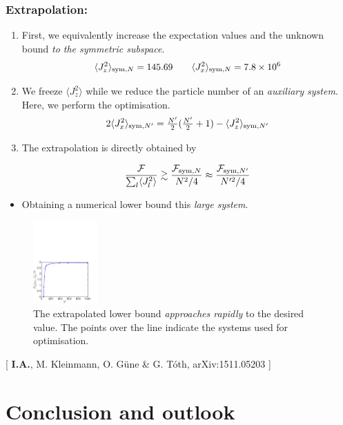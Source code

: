 \documentclass{beamer}
\newcommand{\expect}[1]{\ensuremath{\langle #1 \rangle}}
\newcommand{\citate}[1]{{\footnotesize{\color{gray}[ #1 ]}}

	}
\begin{document}
		\begin{frame}
			\frametitle{Extrapolation:}
			\begin{enumerate}
				\item<1-> First, we equivalently increase the expectation values and the unknown bound \emph{\color{blue}to the symmetric subspace}.
					\[
						\expect{J_z^2}_{{\rm sym},N} = 145.69 \qquad
						\expect{J_x^2}_{{\rm sym},N} = 7.8 \times 10^6
					\]
				\item<2-> We freeze $\expect{J_z^2}$ while we reduce the particle number of an \emph{\color{blue}auxiliary system}. Here, we perform the optimisation.
					\[ 2\expect{J_x^2}_{{\rm sym},N'} = \tfrac{N'}{2}(\tfrac{N'}{2}+1)- \expect{J_z^2}_{{\rm sym},N'} \]
				\item<3-> The extrapolation is directly obtained by
				\begin{block}
					{}
					\[ \frac{\mathcal{F}}{\sum_l \expect{J_l^2}}\gtrsim  \frac{\mathcal{F}_{{\rm sym},N}}{N^2/4} \approx \frac{\mathcal{F}_{{\rm sym},N'}}{N'^2/4}
					\]
				\end{block}
			\end{enumerate}
		\end{frame}

		\begin{frame}
			\begin{itemize}
				\item Obtaining a numerical lower bound this \emph{\color{blue}large system}.
			\end{itemize}
			\vspace{-10px}
			\begin{figure}
				\includegraphics[height=120px]{img/asymptoticapproach-dicke.pdf}
				\caption{The extrapolated lower bound \emph{\color{blue}approaches rapidly} to the desired value. The points over the line indicate the systems used for optimisation.}
			\end{figure}
			\vspace{-15px}
			\citate{\textbf{I.A.}, M. Kleinmann, O. G\"une \& G. T\'oth, arXiv:1511.05203}
		\end{frame}

\section{Conclusion and outlook}
\end{document}
